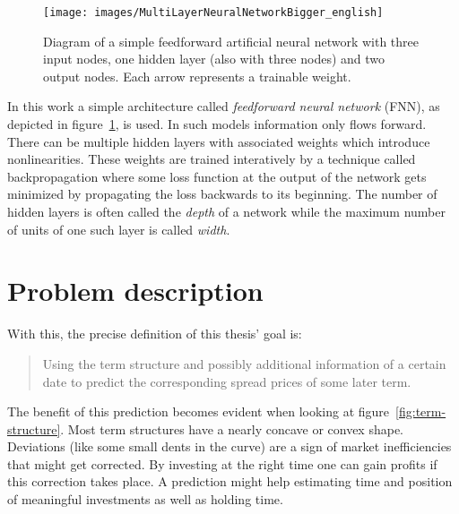 \begin{figure}
	\centering
	\texttt{[image: images/MultiLayerNeuralNetworkBigger\_english]}
	\caption[Diagram of a multi-layer feedforward artificial neural network]{%
		Diagram of a simple feedforward artificial neural network with three input nodes, one hidden layer (also with three nodes) and two output nodes. Each arrow represents a trainable weight.{\cite{wikimedia-fnn}}
	}
	\label{fig:multilayerneuralnetwork}
\end{figure}

In this work a simple architecture called \emph{feedforward neural network} (FNN), as depicted in figure~\ref{fig:multilayerneuralnetwork}, is used. In such models information only flows forward. There can be multiple hidden layers with associated weights which introduce nonlinearities. These weights are trained interatively by a technique called backpropagation where some loss function at the output of the network gets minimized by propagating the loss backwards to its beginning. The number of hidden layers is often called the \emph{depth} of a network while the maximum number of units of one such layer is called \emph{width}.

\section{Problem description}
\label{sec:problem-description}

With this, the precise definition of this thesis' goal is:

\begin{quote}
	Using the term structure and possibly additional information of a certain date to predict the corresponding spread prices of some later term.
\end{quote}

The benefit of this prediction becomes evident when looking at figure~\ref{fig:term-structure}. Most term structures have a nearly concave or convex shape. Deviations (like some small dents in the curve) are a sign of market inefficiencies that might get corrected. By investing at the right time one can gain profits if this correction takes place. A prediction might help estimating time and position of meaningful investments as well as holding time.


